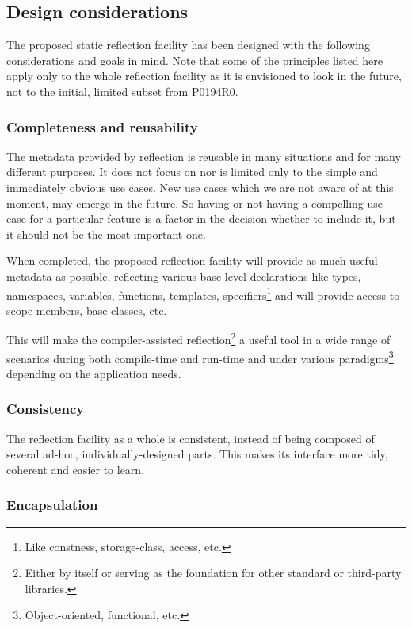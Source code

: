 \subsection{Design considerations}

The proposed static reflection facility has been designed with the following
considerations and goals in mind. 
Note that some of the principles listed here
apply only to the whole reflection facility as it is envisioned
to look in the future, not to the initial, limited subset from P0194R0.

\subsubsection{Completeness and reusability}
\label{design-completeness}

The metadata provided by reflection is reusable in many situations
and for many different purposes.
It does not focus on nor is limited only to the simple and immediately obvious
use cases. New use cases which we are not aware of at this moment, may emerge
in the future. So having or not having a compelling use case for a particular
feature is a factor in the decision whether to include it, but it should
not be the most important one.

When completed, the proposed reflection facility will provide as much useful
metadata as possible, reflecting various base-level
declarations like types, namespaces, variables, functions, templates,
specifiers\footnote{Like constness, storage-class, access, etc.} and
will provide access to scope members, base classes, etc.

This will make the compiler-assisted reflection\footnote{Either by itself or
serving as the foundation for other standard or third-party libraries.} a useful
tool in a wide range of scenarios during both compile-time
and run-time and under various paradigms\footnote{Object-oriented, functional,
etc.} depending on the application needs.

\subsubsection{Consistency}
\label{design-consistency}

The reflection facility as a whole is consistent, instead of being
composed of several ad-hoc, individually-designed parts. This makes
its interface more tidy, coherent and easier to learn.

\subsubsection{Encapsulation}
\label{design-encapsulation}

